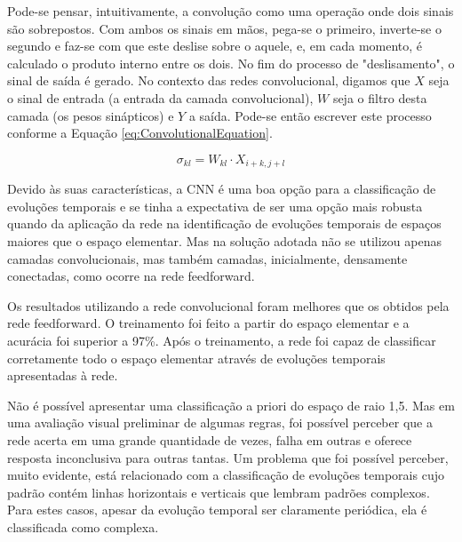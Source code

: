\documentclass[12pt,a4paper]{report}
\begin{document}
	Pode-se pensar, intuitivamente, a convolução como uma operação onde dois sinais são sobrepostos. Com ambos os sinais em mãos, pega-se o primeiro, inverte-se o segundo e faz-se com que este deslise sobre o aquele, e, em cada momento, é calculado o produto interno entre os dois. No fim do processo de "deslisamento", o sinal de saída é gerado. No contexto das redes convolucional, digamos que $X$ seja o sinal de entrada (a entrada da camada convolucional), $W$ seja o filtro desta camada (os pesos sinápticos) e $Y$ a saída. Pode-se então escrever este processo conforme a Equação \ref{eq:ConvolutionalEquation}.
	
	\begin{equation}
	\sigma_{kl} = W_{kl} \cdot X_{i+k,j+l}
	\label{eq:ConvolutionalEquation}
	\end{equation}
	
	Devido às suas características, a CNN é uma boa opção para a classificação de evoluções temporais e se tinha a expectativa de ser uma opção mais robusta quando da aplicação da rede na identificação de evoluções temporais de espaços maiores que o espaço elementar. Mas na solução adotada não se utilizou apenas camadas convolucionais, mas também camadas, inicialmente, densamente conectadas, como ocorre na rede feedforward.
	
	Os resultados utilizando a rede convolucional foram melhores que os obtidos pela rede feedforward. O treinamento foi feito a partir do espaço elementar e a acurácia foi superior a 97\%. Após o treinamento, a rede foi capaz de classificar corretamente todo o espaço elementar através de evoluções temporais apresentadas à rede.
	
	Não é possível apresentar uma classificação a priori do espaço de raio 1,5. Mas em uma avaliação visual preliminar de algumas regras, foi possível perceber que a rede acerta em uma grande quantidade de vezes, falha em outras e oferece resposta inconclusiva para outras tantas. Um problema que foi possível perceber, muito evidente, está relacionado com a classificação de evoluções temporais cujo padrão contém linhas horizontais e verticais que lembram padrões complexos. Para estes casos, apesar da evolução temporal ser claramente periódica, ela é classificada como complexa.
	
\end{document}
